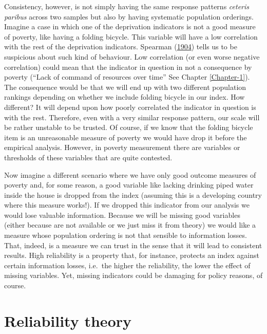 \documentclass[]{book}
\begin{document}
Consistency, however, is not simply having the same response patterns \emph{ceteris paribus} across two samples but also by having systematic population orderings. Imagine a case in which one of the deprivation indicators is not a good measure of poverty, like having a folding bicycle. This variable will have a low correlation with the rest of the deprivation indicators. Spearman (\protect\hyperlink{ref-Spearman1904}{1904}) tells us to be suspicious about such kind of behaviour. Low correlation (or even worse negative correlation) could mean that the indicator in question in not a consequence by poverty (``Lack of command of resources over time'' See Chapter \ref{Chapter-1}). The consequence would be that we will end up with two different population rankings depending on whether we include folding bicycle in our index. How different? It will depend upon how poorly correlated the indicator in question is with the rest. Therefore, even with a very similar response pattern, our scale will be rather unstable to be trusted. Of course, if we know that the folding bicycle item is an unreasonable measure of poverty we would have drop it before the empirical analysis. However, in poverty measurement there are variables or thresholds of these variables that are quite contested.

Now imagine a different scenario where we have only good outcome measures of poverty and, for some reason, a good variable like lacking drinking piped water inside the house is dropped from the index (assuming this is a developing country where this measure works!). If we dropped this indicator from our analysis we would lose valuable information. Because we will be missing good variables (either because are not available or we just miss it from theory) we would like a measure whose population ordering is not that sensible to information losses. That, indeed, is a measure we can trust in the sense that it will lead to consistent results. High reliability is a property that, for instance, protects an index against certain information losses, i.e.~the higher the reliability, the lower the effect of missing variables. Yet, missing indicators could be damaging for policy reasons, of course.

\hypertarget{reliability-theory}{%
\section{Reliability theory}\label{reliability-theory}}
\end{document}
